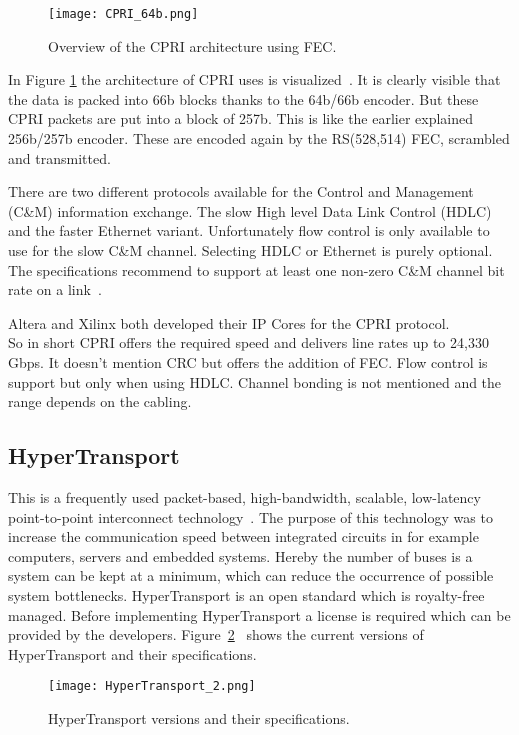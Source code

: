 	\begin{figure}[H]
		\centering
		\texttt{[image: CPRI\_64b.png]}	
		\caption{Overview of the CPRI architecture using FEC.}
		\label{Fig:CPRI_Architecture}
	\end{figure}
	
	In Figure \ref{Fig:CPRI_Architecture} the architecture of CPRI uses is visualized~\cite{CPRI_Specification}. It is clearly visible that the data is packed into 66b blocks thanks to the 64b/66b encoder. But these CPRI packets are put into a block of 257b. This is like the earlier explained 256b/257b encoder. These are encoded again by the RS(528,514) FEC, scrambled and transmitted.
	
	There are two different protocols available for the Control and Management (C\&M) information exchange. The slow High level Data Link Control (HDLC) and the faster Ethernet variant. 
	Unfortunately flow control is only available to use for the slow C\&M channel. Selecting HDLC or Ethernet is purely optional. The specifications recommend to support at least one non-zero C\&M channel bit rate on a link~\cite{CPRI_Specification}.
	
	Altera and Xilinx both developed their IP Cores for the CPRI protocol.\\
	So in short CPRI offers the required speed and delivers line rates up to 24,330 Gbps. It doesn't mention CRC but offers the addition of FEC. Flow control is support but only when using HDLC. Channel bonding is not mentioned and the range depends on the cabling.


\subsection{HyperTransport}
	This is a frequently used packet-based, high-bandwidth, scalable, low-latency point-to-point interconnect technology~\cite{HyperTransport_Specifications}. The purpose of this technology was to increase the communication speed between integrated circuits in for example computers, servers and embedded systems.
	Hereby the number of buses is a system can be kept at a minimum, which can reduce the occurrence of possible system bottlenecks. HyperTransport is an open standard which is royalty-free managed. Before implementing HyperTransport a license is required which can be provided by the developers. Figure~\ref{Fig:HyperTransport_Versions}~\cite{HTpic} shows the current versions of HyperTransport and their specifications. 
	
	\begin{figure}[h]
		\centering
		\texttt{[image: HyperTransport\_2.png]}	
		\caption{HyperTransport versions and their specifications.}
		\label{Fig:HyperTransport_Versions}
	\end{figure}
	
